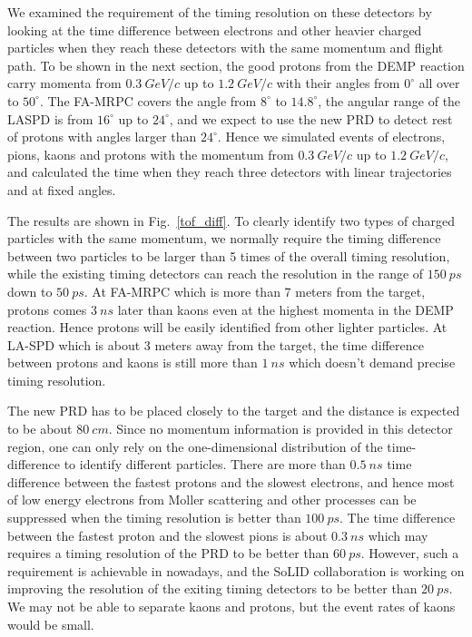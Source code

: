 We examined the requirement of the timing resolution on these detectors by looking at the time difference between electrons and other heavier charged particles when they reach these detectors with the same momentum and flight path. To be shown in the next section, the good protons from the DEMP reaction carry momenta from $0.3~GeV/c$ up to $1.2~GeV/c$ with their angles from $0^{\circ}$ all over to $50^{\circ}$. The FA-MRPC covers the angle from $8^{\circ}$ to $14.8^{\circ}$, the angular range of the LASPD is from $16^{\circ}$ up to $24^{\circ}$, and we expect to use the new PRD to detect rest of protons with angles larger than $24^{\circ}$.  Hence we simulated events of electrons, pions, kaons and protons with the momentum from $0.3~GeV/c$ up to $1.2~GeV/c$, and calculated the time when they reach three detectors with linear trajectories and at fixed angles.

The results are shown in Fig.~\ref{tof_diff}. To clearly identify two types of charged particles with the same momentum, we normally require the timing difference between two particles to be larger than 5 times of the overall timing resolution, while the existing timing detectors can reach the resolution in the range of $150~ps$ down to $50~ps$.  At FA-MRPC which is more than 7 meters from the target, protons comes $3~ns$ later than kaons even at the highest momenta in the DEMP reaction. Hence protons will be easily identified from other lighter particles. At LA-SPD which is about 3 meters away from the target, the time difference between protons and kaons is still more than $1~ns$ which doesn't demand precise timing resolution. 

The new PRD has to be placed closely to the target and the distance is expected to be about $80~cm$. Since no momentum information is provided in this detector region, one can only rely on the one-dimensional distribution of the time-difference to identify different particles. There are more than $0.5~ns$ time difference between the fastest protons and the slowest electrons, and hence most of low energy electrons from Moller scattering and other processes can be suppressed when the timing resolution is better than $100~ps$. The time difference between the fastest proton and the slowest pions is about $0.3~ns$ which may requires a timing resolution of the PRD to be better than $60~ps$.  However, such a requirement is achievable in nowadays, and the SoLID collaboration is working on improving the resolution of the exiting timing detectors to be better than $20~ps$. We may not be able to separate kaons and protons, but the event rates of kaons would be small. 

